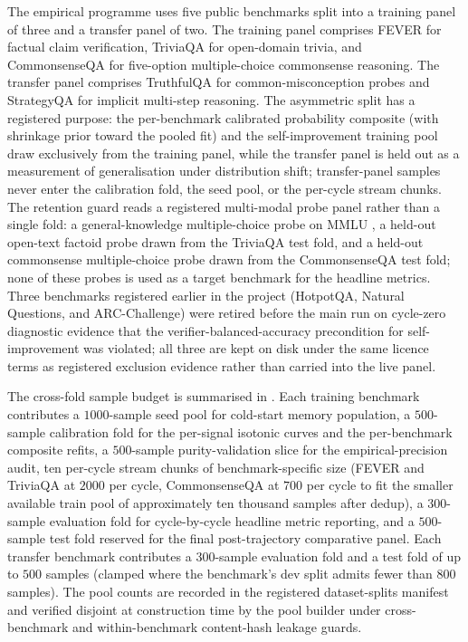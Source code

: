 The empirical programme uses five public benchmarks split into a training panel of three and a transfer panel of two. The training panel comprises FEVER \cite{thorne-etal-2018-fever} for factual claim verification, TriviaQA \cite{joshi-etal-2017-triviaqa} for open-domain trivia, and CommonsenseQA \cite{talmor-etal-2019-commonsenseqa} for five-option multiple-choice commonsense reasoning. The transfer panel comprises TruthfulQA \cite{lin-etal-2022-truthfulqa} for common-misconception probes and StrategyQA \cite{10.1162/tacl_a_00370} for implicit multi-step reasoning. The asymmetric split has a registered purpose: the per-benchmark calibrated probability composite (with shrinkage prior toward the pooled fit) and the self-improvement training pool draw exclusively from the training panel, while the transfer panel is held out as a measurement of generalisation under distribution shift; transfer-panel samples never enter the calibration fold, the seed pool, or the per-cycle stream chunks. The retention guard reads a registered multi-modal probe panel rather than a single fold: a general-knowledge multiple-choice probe on MMLU \cite{hendrycks2021measuring}, a held-out open-text factoid probe drawn from the TriviaQA test fold, and a held-out commonsense multiple-choice probe drawn from the CommonsenseQA test fold; none of these probes is used as a target benchmark for the headline metrics. Three benchmarks registered earlier in the project (HotpotQA, Natural Questions, and ARC-Challenge) were retired before the main run on cycle-zero diagnostic evidence that the verifier-balanced-accuracy precondition for self-improvement was violated; all three are kept on disk under the same licence terms as registered exclusion evidence rather than carried into the live panel.

The cross-fold sample budget is summarised in . Each training benchmark contributes a $1000$-sample seed pool for cold-start memory population, a $500$-sample calibration fold for the per-signal isotonic curves and the per-benchmark composite refits, a $500$-sample purity-validation slice for the empirical-precision audit, ten per-cycle stream chunks of benchmark-specific size (FEVER and TriviaQA at $2000$ per cycle, CommonsenseQA at $700$ per cycle to fit the smaller available train pool of approximately ten thousand samples after dedup), a $300$-sample evaluation fold for cycle-by-cycle headline metric reporting, and a $500$-sample test fold reserved for the final post-trajectory comparative panel. Each transfer benchmark contributes a $300$-sample evaluation fold and a test fold of up to $500$ samples (clamped where the benchmark's dev split admits fewer than $800$ samples). The pool counts are recorded in the registered dataset-splits manifest and verified disjoint at construction time by the pool builder under cross-benchmark and within-benchmark content-hash leakage guards.

